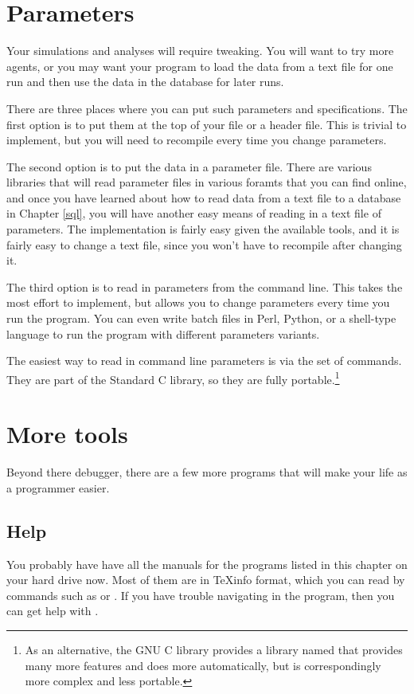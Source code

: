 \section{Parameters} Your simulations and analyses will require
tweaking. You will want to try more agents, or you may want your program
to load the data from a text file for one run and then use the data in
the database for later runs.

There are three places where you can put such parameters and
specifications. The first option is to put them at the top of your 
file or a header file. This is trivial to implement, but you will need
to recompile every time you change parameters.

The second option is to put the data in a parameter file. There are
various libraries that will read parameter files in various foramts that
you can find online, and once you have learned about how to read data
from a text file to a database in Chapter \ref{sql}, you will have
another easy means of reading in a text file of parameters. 
The implementation is fairly easy given the available tools, and it is fairly easy to change 
a text file, since you won't have to recompile after changing it.

The third option is to read in parameters from the command line. This
takes the most effort to implement, but allows you to change parameters
every time you run the program. You can even write batch files in Perl,
Python, or a shell-type language to run the program with different parameters variants.

The easiest way to read in command line parameters is via the
 set of commands. They are part of the Standard C
library, so they are fully portable.\footnote{As an alternative, the
GNU C library provides a library named  that provides many
more features and does more automatically, but is correspondingly more
complex and less portable.}

\section{More tools} 
Beyond there debugger, there are a few more programs that will make your life as a programmer easier.

\subsection{Help} 
You probably have have all the manuals for the programs listed in this
chapter on your hard drive now. Most of them are in \TeX info format,
which you can read by commands such as  or . If
you have trouble navigating in the  program, then you can
get help with .

